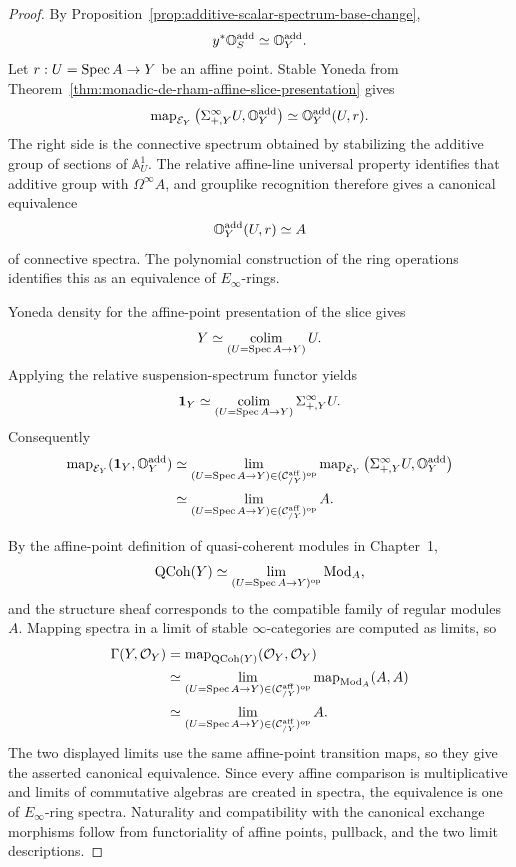 \begin{proof}
By Proposition~\ref{prop:additive-scalar-spectrum-base-change},
\[
    y^*\mathbb O_S^{\mathrm{add}}\simeq\mathbb O_Y^{\mathrm{add}}.
\]
Let \(r:U=\operatorname{Spec} A\to Y\) be an affine point.  Stable Yoneda from
Theorem~\ref{thm:monadic-de-rham-affine-slice-presentation} gives
\[
    \operatorname{map}_{\mathcal E_Y}
    \left(
        \Sigma^\infty_{+,Y}U,
        \mathbb O_Y^{\mathrm{add}}
    \right)
    \simeq
    \mathbb O_Y^{\mathrm{add}}(U,r).
\]
The right side is the connective spectrum obtained by stabilizing the additive group of sections of
\(\mathbb A^1_U\).  The relative affine-line universal property identifies that additive group with
\(\Omega^\infty A\), and grouplike recognition therefore gives a canonical equivalence
\[
    \mathbb O_Y^{\mathrm{add}}(U,r)\simeq A
\]
of connective spectra.  The polynomial construction of the ring operations identifies this as an
equivalence of \(E_\infty\)-rings.

Yoneda density for the affine-point presentation of the slice gives
\[
    Y
    \simeq
    \operatorname*{colim}_{(U=\operatorname{Spec} A\to Y)}U.
\]
Applying the relative suspension-spectrum functor yields
\[
    \mathbf 1_Y
    \simeq
    \operatorname*{colim}_{(U=\operatorname{Spec} A\to Y)}
    \Sigma^\infty_{+,Y}U.
\]
Consequently
\[
\begin{aligned}
    \operatorname{map}_{\mathcal E_Y}
    (\mathbf 1_Y,\mathbb O_Y^{\mathrm{add}})
    &\simeq
    \operatorname*{lim}_{(U=\operatorname{Spec} A\to Y)\in(\mathcal C^{\mathrm{aff}}_{/Y})^{\mathrm{op}}}
    \operatorname{map}_{\mathcal E_Y}
    \left(
        \Sigma^\infty_{+,Y}U,
        \mathbb O_Y^{\mathrm{add}}
    \right)
    \\
    &\simeq
    \operatorname*{lim}_{(U=\operatorname{Spec} A\to Y)\in(\mathcal C^{\mathrm{aff}}_{/Y})^{\mathrm{op}}}A.
\end{aligned}
\]

By the affine-point definition of quasi-coherent modules in Chapter~1,
\[
    \operatorname{QCoh}(Y)
    \simeq
    \operatorname*{lim}_{(U=\operatorname{Spec} A\to Y)^{\mathrm{op}}}\operatorname{Mod}_A,
\]
and the structure sheaf corresponds to the compatible family of regular modules \(A\).  Mapping
spectra in a limit of stable \(\infty\)-categories are computed as limits, so
\[
\begin{aligned}
    \Gamma(Y,\mathcal O_Y)
    &=
    \operatorname{map}_{\operatorname{QCoh}(Y)}
    (\mathcal O_Y,\mathcal O_Y)
    \\
    &\simeq
    \operatorname*{lim}_{(U=\operatorname{Spec} A\to Y)\in(\mathcal C^{\mathrm{aff}}_{/Y})^{\mathrm{op}}}
    \operatorname{map}_{\operatorname{Mod}_A}(A,A)
    \\
    &\simeq
    \operatorname*{lim}_{(U=\operatorname{Spec} A\to Y)\in(\mathcal C^{\mathrm{aff}}_{/Y})^{\mathrm{op}}}A.
\end{aligned}
\]
The two displayed limits use the same affine-point transition maps, so they give the asserted
canonical equivalence.  Since every affine comparison is multiplicative and limits of commutative
algebras are created in spectra, the equivalence is one of \(E_\infty\)-ring spectra.  Naturality
and compatibility with the canonical exchange morphisms follow from functoriality of affine points,
pullback, and the two limit descriptions.
\end{proof}


